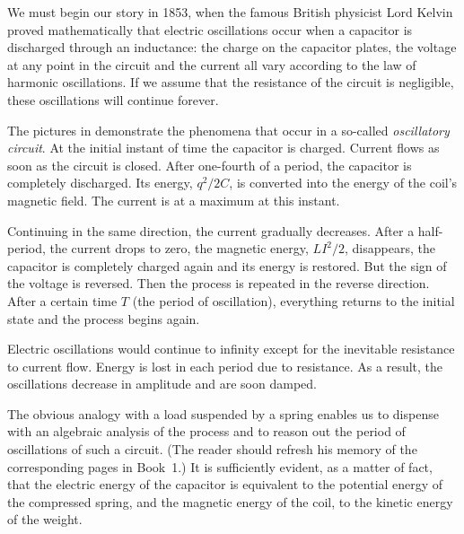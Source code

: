 We must begin our story in 1853, when the famous British physicist Lord Kelvin proved mathematically that electric oscillations occur when a capacitor is discharged through an inductance: the charge on the capacitor plates, the voltage at any point in the circuit and the current all vary according to the law of harmonic oscillations. If we assume that the resistance of the circuit is negligible, these oscillations will continue forever.

The pictures in  demonstrate the phenomena that occur in a so-called \emph{oscillatory circuit}. At the initial instant of time the capacitor is charged. Current flows as soon as the circuit is closed. After one-fourth of a period, the capacitor is completely discharged. Its energy, $q^{2}/2C$, is converted into the energy of the coil's magnetic field. The current is at a maximum at this instant. 

Continuing in the same direction, the current gradually decreases. After a half-period, the current drops to zero, the magnetic energy, $LI^{2}/2$, disappears, the capacitor is completely charged again and its energy is restored. But the sign of the voltage is reversed. Then the process is repeated in the reverse direction. After a certain time $T$ (the period of oscillation), everything returns to the initial state and the process begins again.

Electric oscillations would continue to infinity except for the inevitable resistance to current flow. Energy is lost in each period due to resistance. As a result, the oscillations decrease in amplitude and are soon damped.

The obvious analogy with a load suspended by a spring enables us to dispense with an algebraic analysis of the process and to reason out the period of oscillations of such a circuit. (The reader should refresh his memory of the corresponding pages in Book~1.) It is sufficiently evident, as a matter of fact, that the electric energy
of the capacitor is equivalent to the potential energy of the compressed spring, and the magnetic energy of the coil, to the kinetic energy of the weight.

